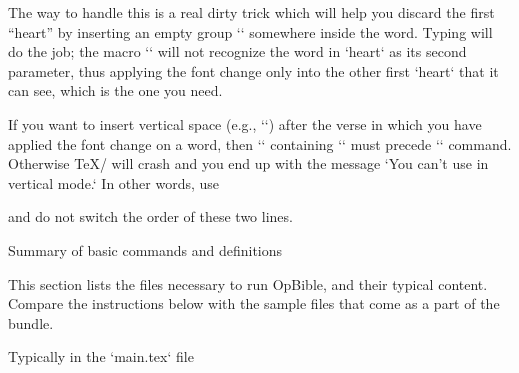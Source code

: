 {{The way to handle this is a real dirty trick which will help you discard the first “heart” by 
inserting an empty group `{}` somewhere inside the word.
Typing
\medskip
\begtt
{}
\endtt
%
will do the job; the macro `\fmtfont`  will not recognize the word in `hea{}rt` as its second 
parameter, thus applying the font change only into the other first `heart` that it can see, 
which is the one you need. 


\watchout
If you want to insert vertical space (e.g., `\medskip`) after the verse in which you have 
applied the font change on a word, then `\fmtins` containing `\medskip` must precede `\fmtfont` 
command. Otherwise \TeX/ will crash and you end up with the message `You can't use \/ in vertical 
mode.`
In other words, use 

\begtt
{}
\endtt
%
and do not switch the order of these two lines.






%
\sec[sum] Summary of basic commands and definitions

This section lists the files necessary to run OpBible, and their typical content.
\recommended
Compare the instructions below with the sample files that come as a part of the bundle. 



\secc Typically in the `main.tex` file

}}
